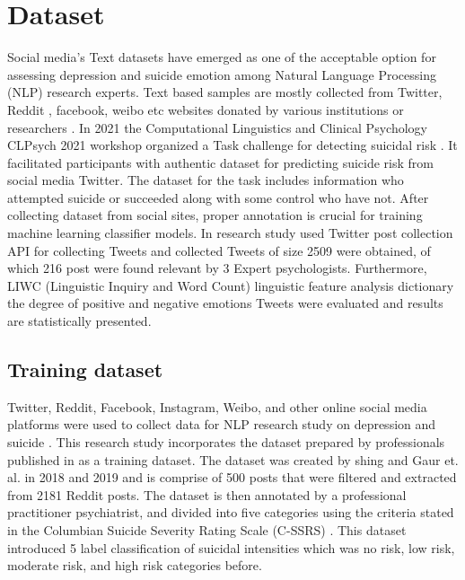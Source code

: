 \documentclass[sn-mathphys,Numbered]{sn-jnl}%
\theoremstyle{thmstyleone}%
\theoremstyle{thmstyletwo}%
\theoremstyle{thmstylethree}%
\begin{document}
\section{Dataset}
\label{dtset}
Social media's Text datasets have emerged as one of the acceptable option for assessing depression and suicide emotion among Natural Language Processing (NLP) research experts. Text based samples are mostly collected from Twitter, Reddit \cite{tadesse2019detection}, facebook, weibo etc websites donated by various institutions or researchers \cite{rissola2020dataset}. In 2021 the Computational Linguistics and Clinical Psychology CLPsych 2021 workshop organized a Task challenge for detecting suicidal risk \cite{macavaney2021community}. It facilitated participants with authentic dataset for predicting suicide risk from social media Twitter. The dataset for the task includes information who attempted suicide or succeeded along with some control who have not. After collecting dataset from social sites, proper annotation is crucial for training machine learning classifier models. In\cite{lopez2022exploring} research study used Twitter post collection API for collecting Tweets and collected Tweets of size 2509 were obtained, of which 216 post were found relevant by 3 Expert psychologists. Furthermore, LIWC (Linguistic Inquiry and Word Count) \cite{pennebaker2001linguistic} linguistic feature analysis dictionary the degree of positive and negative emotions Tweets were evaluated and results are statistically presented. 

\subsection{Training dataset}
Twitter, Reddit, Facebook, Instagram, Weibo, and other online social media platforms were used to collect data for NLP research study on depression and suicide \cite{wang2020depression, malhotra2022deep}. This research study incorporates the dataset prepared by professionals published in \cite{gaur2019knowledge} as a training dataset. The dataset was created by shing and Gaur et. al. in 2018 \cite{shing2018expert} and 2019 \cite{gaur2019knowledge} and is comprise of 500 posts that were filtered and extracted from 2181 Reddit posts. The dataset is then annotated by a professional practitioner psychiatrist, and divided into five categories using the criteria stated in the Columbian Suicide Severity Rating Scale (C-SSRS) \cite{gaur2019knowledge}. This dataset introduced 5 label classification of suicidal intensities which was no risk, low risk, moderate risk, and high risk categories before. 
\end{document}
